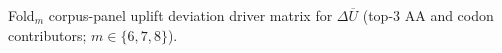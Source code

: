 Fold$_m$ corpus-panel uplift deviation driver matrix for $\Delta\overline{U}$ (top-3 AA and codon contributors; $m\in\{6,7,8\}$).
